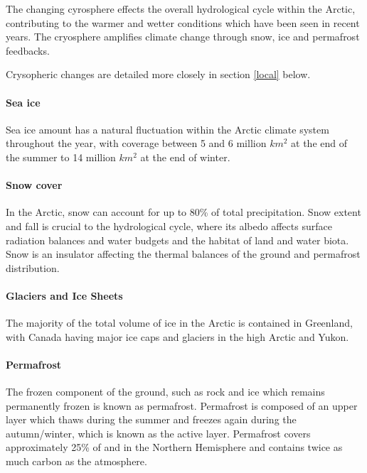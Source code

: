 \documentclass[12pt, oneside]{article}
\begin{document}
The changing cyrosphere effects the overall hydrological cycle within the Arctic, contributing to the warmer and wetter conditions which have been seen in recent years. The cryosphere amplifies climate change through snow, ice and permafrost feedbacks. 

Crysopheric changes are detailed more closely in section \ref{local} below. 

\paragraph{Sea ice}
Sea ice amount has a natural fluctuation within the Arctic climate system throughout the year, with coverage between 5 and 6 million $km^2$ at the end of the summer to 14 million $km^2$ at the end of winter. 

\paragraph{Snow cover}
In the Arctic, snow can account for up to 80\% of total precipitation. Snow extent and fall is crucial to the hydrological cycle, where its albedo affects surface radiation balances and water budgets and the habitat of land and water biota. Snow is an insulator affecting the thermal balances of the ground and permafrost distribution. 


\paragraph{Glaciers and Ice Sheets}
The majority of the total volume of ice in the Arctic is contained in Greenland, with Canada having major ice caps and glaciers in the high Arctic and Yukon. 

\paragraph{Permafrost}\label{permafrost}

The frozen component of the ground, such as rock and ice which remains permanently frozen is known as permafrost. Permafrost is composed of an upper layer which thaws during the summer and freezes again during the autumn/winter, which is known as the active layer. Permafrost covers approximately 25\% of and in the Northern Hemisphere and contains twice as much carbon as the atmosphere. 

\end{document}
